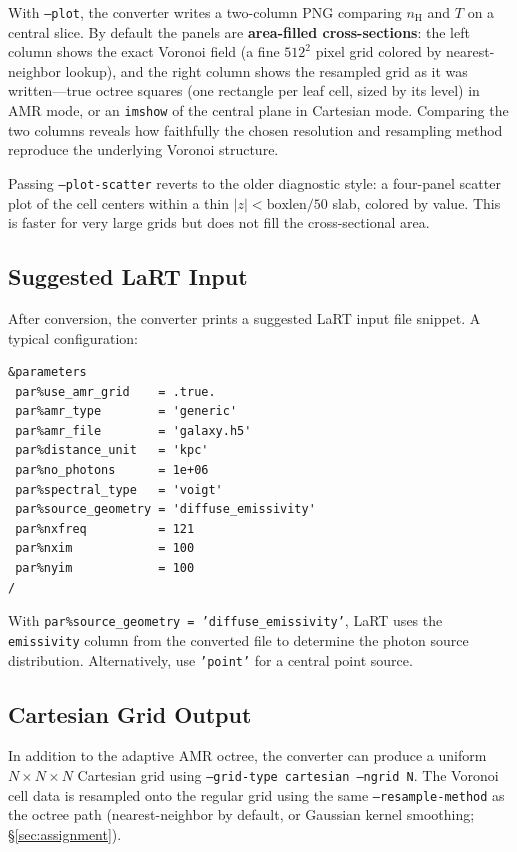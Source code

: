 \documentclass[english,a4paper]{my_memo}
\begin{document}
With \texttt{--plot}, the converter writes a two-column PNG comparing
$n_\mathrm{H}$ and $T$ on a central slice.  By default the panels are
\textbf{area-filled cross-sections}: the left column shows the exact
Voronoi field (a fine $512^2$ pixel grid colored by nearest-neighbor
lookup), and the right column shows the resampled grid as it was
written---true octree squares (one rectangle per leaf cell, sized by
its level) in AMR mode, or an \texttt{imshow} of the central plane in
Cartesian mode.  Comparing the two columns reveals how faithfully the
chosen resolution and resampling method reproduce the underlying
Voronoi structure.

Passing \texttt{--plot-scatter} reverts to the older diagnostic style:
a four-panel scatter plot of the cell centers within a thin
$|z| < \mathrm{boxlen}/50$ slab, colored by value.  This is faster for
very large grids but does not fill the cross-sectional area.

\subsection{Suggested LaRT Input}

After conversion, the converter prints a suggested LaRT input file
snippet.  A typical configuration:

\begin{lstlisting}[style=fortranstyle]
&parameters
 par%use_amr_grid    = .true.
 par%amr_type        = 'generic'
 par%amr_file        = 'galaxy.h5'
 par%distance_unit   = 'kpc'
 par%no_photons      = 1e+06
 par%spectral_type   = 'voigt'
 par%source_geometry = 'diffuse_emissivity'
 par%nxfreq          = 121
 par%nxim            = 100
 par%nyim            = 100
/
\end{lstlisting}

With \texttt{par\%source\_geometry = 'diffuse\_emissivity'}, LaRT uses
the \texttt{emissivity} column from the converted file to determine the
photon source distribution.  Alternatively, use \texttt{'point'} for a
central point source.

\subsection{Cartesian Grid Output}
\label{sec:cartesian_grid}

In addition to the adaptive AMR octree, the converter can produce a
uniform $N \times N \times N$ Cartesian grid using
\texttt{--grid-type cartesian --ngrid N}.  The Voronoi cell data is
resampled onto the regular grid using the same
\texttt{--resample-method} as the octree path (nearest-neighbor by
default, or Gaussian kernel smoothing; \S\ref{sec:assignment}).
\end{document}
